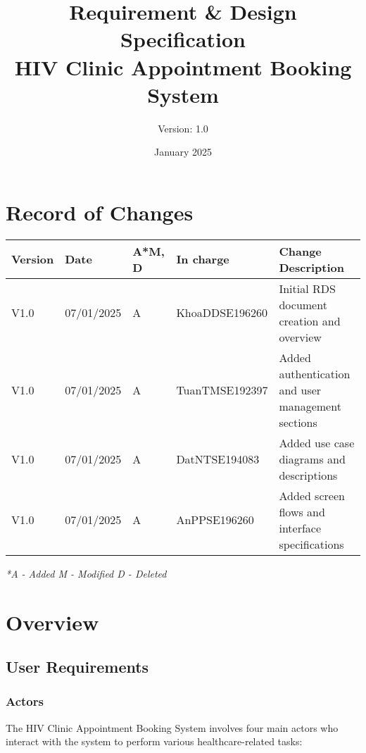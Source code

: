 \documentclass[12pt,a4paper]{article}
\title{\textbf{Requirement \& Design Specification\\HIV Clinic Appointment Booking System}}
\author{Version: 1.0}
\date{January 2025}
\begin{document}
\maketitle
\thispagestyle{empty}

\newpage

\section*{Record of Changes}

\begin{longtable}{|p{2cm}|p{2cm}|p{1cm}|p{3cm}|p{6cm}|}
\hline
\textbf{Version} & \textbf{Date} & \textbf{A*M, D} & \textbf{In charge} & \textbf{Change Description} \\
\hline
V1.0 & 07/01/2025 & A & KhoaDDSE196260 & Initial RDS document creation and overview \\
\hline
V1.0 & 07/01/2025 & A & TuanTMSE192397 & Added authentication and user management sections \\
\hline
V1.0 & 07/01/2025 & A & DatNTSE194083 & Added use case diagrams and descriptions \\
\hline
V1.0 & 07/01/2025 & A & AnPPSE196260 & Added screen flows and interface specifications \\
\hline
\end{longtable}

\textit{*A - Added M - Modified D - Deleted}

\newpage

\tableofcontents

\newpage

\section{Overview}

\subsection{User Requirements}

\subsubsection{Actors}

The HIV Clinic Appointment Booking System involves four main actors who interact with the system to perform various healthcare-related tasks:
\end{document}
